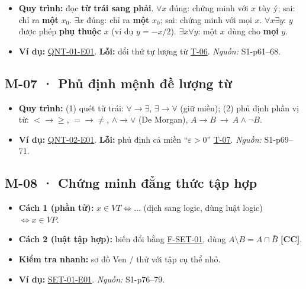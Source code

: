 \documentclass[
  10pt,
  twoside,openany]{book}
\providecommand{\tightlist}{%
  \setlength{\itemsep}{0pt}\setlength{\parskip}{0pt}}
\begin{document}
\begin{itemize}
\tightlist
\item
  \textbf{Quy trình:} đọc \textbf{từ trái sang phải}. \(\forall x\)
  đúng: chứng minh với \(x\) tùy ý; sai: chỉ ra \textbf{một} \(x_0\).
  \(\exists x\) đúng: chỉ ra \textbf{một} \(x_0\); sai: chứng minh với
  mọi \(x\). \(\forall x\exists y\): \(y\) được phép \textbf{phụ thuộc}
  \(x\) (ví dụ \(y=-x/2\)). \(\exists x\forall y\): một \(x\) dùng cho
  \textbf{mọi} \(y\).
\item
  \textbf{Ví dụ:} \protect\hyperlink{QNT-01-E01}{QNT-01-E01}.
  \textbf{Lỗi:} đổi thứ tự lượng từ \protect\hyperlink{T-06}{T-06}.
  \emph{Nguồn:} S1-p61--68.
\end{itemize}

\hypertarget{M-07}{%
\subsection{M-07 · Phủ định mệnh đề lượng từ}\label{M-07}}

\begin{itemize}
\tightlist
\item
  \textbf{Quy trình:} (1) quét từ trái: \(\forall\to\exists\),
  \(\exists\to\forall\) (giữ miền); (2) phủ định phần vị từ:
  \(<\to\ge\), \(=\to\ne\), \(\wedge\to\vee\) (De Morgan),
  \(A\to B\ \to\ A\wedge\neg B\).
\item
  \textbf{Ví dụ:} \protect\hyperlink{QNT-02-E01}{QNT-02-E01}.
  \textbf{Lỗi:} phủ định cả miền ``\(\varepsilon>0\)''
  \protect\hyperlink{T-07}{T-07}. \emph{Nguồn:} S1-p69--71.
\end{itemize}

\hypertarget{M-08}{%
\subsection{M-08 · Chứng minh đẳng thức tập hợp}\label{M-08}}

\begin{itemize}
\tightlist
\item
  \textbf{Cách 1 (phần tử):} \(x\in VT\Leftrightarrow\dots\) (dịch sang
  logic, dùng luật logic) \(\Leftrightarrow x\in VP\).
\item
  \textbf{Cách 2 (luật tập hợp):} biến đổi bằng
  \protect\hyperlink{F-SET-01}{F-SET-01}, dùng
  \(A\setminus B=A\cap\bar B\) \textbf{{[}CC{]}}.
\item
  \textbf{Kiểm tra nhanh:} sơ đồ Ven / thử với tập cụ thể nhỏ.
\item
  \textbf{Ví dụ:} \protect\hyperlink{SET-01-E01}{SET-01-E01}.
  \emph{Nguồn:} S1-p76--79.
\end{itemize}
\end{document}
